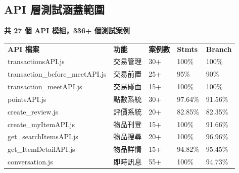\documentclass[11pt, a4paper]{article}
\begin{document}
\subsection{API 層測試涵蓋範圍}

\textbf{共 27 個 API 模組，336+ 個測試案例}

\begin{center}
  \scriptsize
  \renewcommand{\arraystretch}{1.3}
  \begin{longtable}{p{} p{} p{} p{} p{}}
    \rowcolor{NavyBlue} \color{white}\textbf{API 檔案}     & \color{white}\textbf{功能} & \color{white}\textbf{案例數} & \color{white}\textbf{Stmts} & \color{white}\textbf{Branch} \\
    transactionsAPI.js                                   & 交易管理                     & 30+                       & 100\%                       & 100\%                        \\
    \rowcolor{LightGray} transaction\_before\_meetAPI.js & 交易前置                     & 25+                       & 95\%                        & 90\%                         \\
    transaction\_meetAPI.js                              & 交易碰面                     & 15+                       & 100\%                       & 100\%                        \\
    \rowcolor{LightGray} pointsAPI.js                    & 點數系統                     & 30+                       & 97.64\%                     & 91.56\%                      \\
    create\_review.js                                    & 評價系統                     & 20+                       & 82.85\%                     & 82.35\%                      \\
    \rowcolor{LightGray} create\_myItemAPI.js            & 物品刊登                     & 15+                       & 100\%                       & 91.66\%                      \\
    get\_searchItemsAPI.js                               & 物品搜尋                     & 20+                       & 100\%                       & 96.96\%                      \\
    \rowcolor{LightGray} get\_ItemDetailAPI.js           & 物品詳情                     & 15+                       & 94.82\%                     & 95.45\%                      \\
    conversation.js                                      & 即時訊息                     & 55+                       & 100\%                       & 94.73\%                      \\

\end{longtable}
\end{center}
\end{document}
